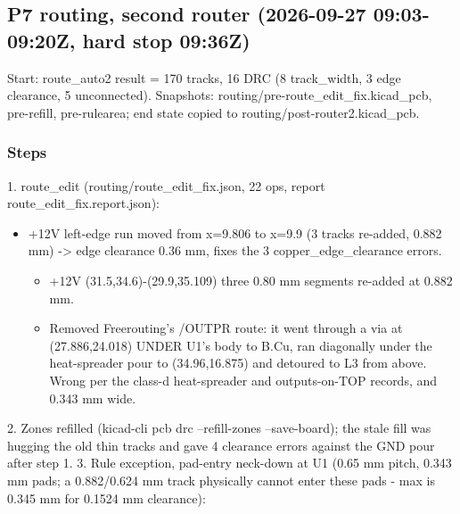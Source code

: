 \documentclass[11pt]{article}
\begin{document}
\subsection*{P7 routing, second router (2026-09-27 09:03-09:20Z, hard stop 09:36Z)}
Start: route\_auto2 result = 170 tracks, 16 DRC (8 track\_width, 3 edge clearance, 5 unconnected). Snapshots: routing/pre-route\_edit\_fix.kicad\_pcb, pre-refill, pre-rulearea; end state copied to routing/post-router2.kicad\_pcb.

\subsubsection*{Steps}
1. route\_edit (routing/route\_edit\_fix.json, 22 ops, report route\_edit\_fix.report.json):

\begin{itemize}
\item +12V left-edge run moved from x=9.806 to x=9.9 (3 tracks re-added, 0.882 mm) -\textgreater{} edge clearance
0.36 mm, fixes the 3 copper\_edge\_clearance errors.
\begin{itemize}
\item +12V (31.5,34.6)-(29.9,35.109) three 0.80 mm segments re-added at 0.882 mm.
\item Removed Freerouting's /OUTPR route: it went through a via at (27.886,24.018) UNDER U1's body
to B.Cu, ran diagonally under the heat-spreader pour to (34.96,16.875) and detoured to L3 from
above. Wrong per the class-d heat-spreader and outputs-on-TOP records, and 0.343 mm wide.
\end{itemize}
\end{itemize}
2. Zones refilled (kicad-cli pcb drc --refill-zones --save-board); the stale fill was hugging the old thin tracks and gave 4 clearance errors against the GND pour after step 1. 3. Rule exception, pad-entry neck-down at U1 (0.65 mm pitch, 0.343 mm pads; a 0.882/0.624 mm track physically cannot enter these pads - max is 0.345 mm for 0.1524 mm clearance):
\end{document}
